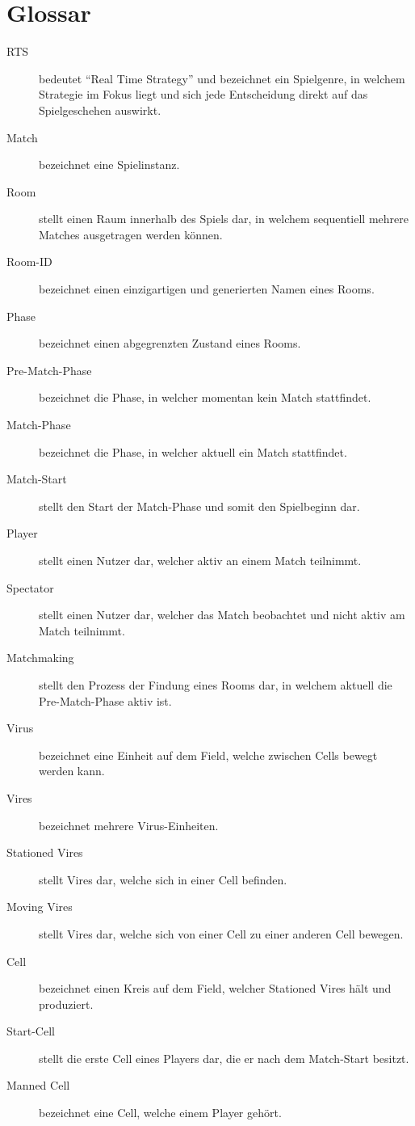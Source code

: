 \section{Glossar}
\label{sec:glossar}
\begin{description}
	\item[RTS] bedeutet ``Real Time Strategy'' und bezeichnet ein Spielgenre, in welchem Strategie im Fokus liegt und sich jede Entscheidung direkt auf das Spielgeschehen auswirkt.
	\item[Match] bezeichnet eine Spielinstanz.
	\item[Room] stellt einen Raum innerhalb des Spiels dar, in welchem sequentiell mehrere Matches ausgetragen werden können.
	\item[Room-ID] bezeichnet einen einzigartigen und generierten Namen eines Rooms.
	\item[Phase] bezeichnet einen abgegrenzten Zustand eines Rooms.
	\item[Pre-Match-Phase] bezeichnet die Phase, in welcher momentan kein Match stattfindet.
	\item[Match-Phase] bezeichnet die Phase, in welcher aktuell ein Match stattfindet.
	\item[Match-Start] stellt den Start der Match-Phase und somit den Spielbeginn dar.
	\item[Player] stellt einen Nutzer dar, welcher aktiv an einem Match teilnimmt.
	\item[Spectator] stellt einen Nutzer dar, welcher das Match beobachtet und nicht aktiv am Match teilnimmt.
	\item[Matchmaking] stellt den Prozess der Findung eines Rooms dar, in welchem aktuell die Pre-Match-Phase aktiv ist.
	\item[Virus] bezeichnet eine Einheit auf dem Field, welche zwischen Cells bewegt werden kann.
	\item[Vires] bezeichnet mehrere Virus-Einheiten.
	\item[Stationed Vires] stellt Vires dar, welche sich in einer Cell befinden.
	\item[Moving Vires] stellt Vires dar, welche sich von einer Cell zu einer anderen Cell bewegen.
	\item[Cell] bezeichnet einen Kreis auf dem Field, welcher Stationed Vires hält und produziert.
	\item[Start-Cell] stellt die erste Cell eines Players dar, die er nach dem Match-Start besitzt.
	\item[Manned Cell] bezeichnet eine Cell, welche einem Player gehört.

\end{description}
